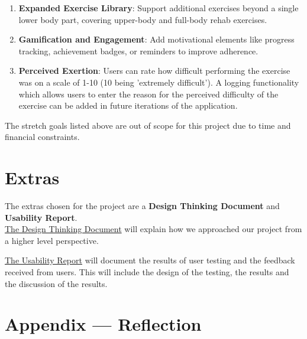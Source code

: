 \documentclass{article}
\begin{document}
\begin{enumerate}
  \item \textbf{Expanded Exercise Library}: Support additional exercises beyond a single lower body part, covering upper-body and full-body rehab exercises.
  
  \item \textbf{Gamification and Engagement}: Add motivational elements like progress tracking, achievement badges, or reminders to improve adherence.
  
  \item \textbf{Perceived Exertion}: Users can rate how difficult performing the exercise was on a scale of 1-10 (10 being 'extremely difficult'). A logging functionality which allows users to enter the reason for the perceived difficulty of the exercise can be added in future iterations of the application. 

\end{enumerate}

The stretch goals listed above are out of scope for this project due to time and financial constraints.

\section{Extras}

The extras chosen for the project are a \textbf{Design Thinking Document}
and \textbf{Usability Report}. \\

\underline{The Design Thinking Document} will explain how we approached our project
from a higher level perspective. 

\underline{The Usability Report} will document the results of user testing and the feedback received from users. This will include the design of the testing, the results and the discussion of the results.

\newpage{}

\section*{Appendix --- Reflection}
\end{document}
